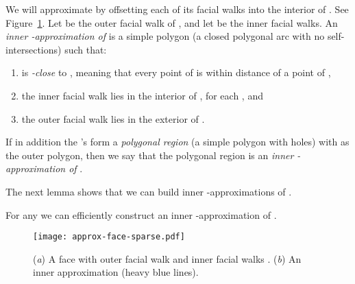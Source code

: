 \documentclass{llncs}
\newcommand{\remove}[1]{}
\begin{document}
We will approximate  by offsetting each of its facial walks into the interior of .
See Figure~\ref{fig:approx}.
Let  be the outer facial walk of , and let  be the inner facial walks.
An {\em inner -approximation of } is a simple polygon  (a closed polygonal arc with no self-intersections) such that:
\begin{enumerate}
\item   is {\em-close} to  , meaning that every point of  is within distance  of a point of ,
\item the inner facial walk  lies in the interior of , for each , and
\item the outer facial walk  lies in the exterior of .
\end{enumerate}
If in addition the 's form a {\em polygonal region} (a simple polygon with holes) with  as the outer polygon, then we say that the polygonal region is an  {\em inner -approximation of }.
\remove{The {\em Hausdorff distance}  of two sets (in a space with metric ) is defined as\footnote{The underlying metric  can be Euclidean or some other appropriate metric.}\\  {\begin{center} .\end{center}} Intuitively, the Hausdorff distance measures how far a point in one set can be from the other set. Sets  and  are {\em -close} if . Then  is an {\em inner -approximation of } if they are -close and there is a  so that all the points -close to  are a subset of .
}
The next lemma shows that we can build inner -approximations of . 

\begin{lemma}\label{cor:fw}
For any  we can efficiently construct an inner -approximation  of .
\end{lemma}

\begin{figure}[tb]
\centering
\texttt{[image: approx-face-sparse.pdf]}
\caption{(\emph{a}) A face  with outer facial walk  and inner facial walks . (\emph{b}) An inner approximation  (heavy blue lines).}
\label{fig:approx}
\end{figure}
\end{document}
